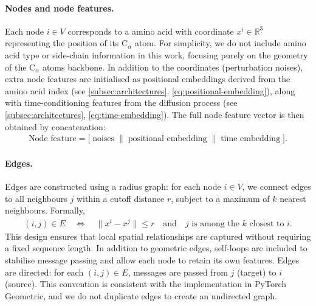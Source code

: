 \documentclass[a4paper,12pt]{article}
\begin{document}
\paragraph{Nodes and node features.}
Each node \(i \in V\) corresponds to a amino acid with coordinate \(x^i \in \mathbb{R}^3\) representing the position of its C\(_\alpha\) atom. For simplicity, we do not include amino acid type or side-chain information in this work, focusing purely on the geometry of the C\(_\alpha\) atoms backbone. In addition to the coordinates (perturbation noises), extra node features are initialised as positional embeddings derived from the amino acid index (see \cref{subsec:architectures}, \cref{eq:positional-embedding}), along with time-conditioning features from the diffusion process (see \cref{subsec:architectures}, \cref{eq:time-embedding}). The full node feature vector is then obtained by concatenation:
\begin{align*}
    \text{Node feature} = \big[ \; \text{noises} \;\|\; \text{positional embedding} \;\|\; \text{time embedding} \;\big].
\end{align*}

\paragraph{Edges.}
Edges are constructed using a radius graph: for each node \(i\in V\), we connect edges to all neighbours \(j\) within a cutoff distance \(r\), subject to a maximum of \(k\) nearest neighbours. Formally,
\begin{align*}
    (i,j) \in E \quad \Leftrightarrow \quad \|x^i - x^j\| \leq r \quad \text{and}\quad j \text{ is among the } k \text{ closest to } i.
\end{align*}
This design ensures that local spatial relationships are captured without requiring a fixed sequence length. In addition to geometric edges, self-loops are included to stabilise message passing and allow each node to retain its own features. Edges are directed: for each \((i,j) \in E\), messages are passed from \(j\) (target) to \(i\) (source). This convention is consistent with the implementation in PyTorch Geometric, and we do not duplicate edges to create an undirected graph.
\end{document}

